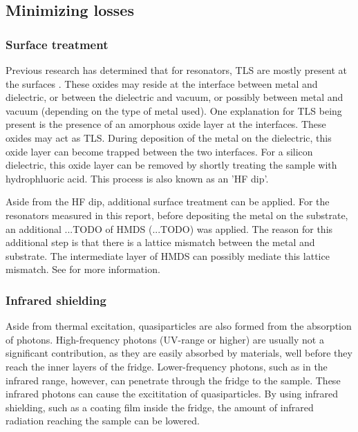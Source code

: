 \documentclass[12pt]{report}
\begin{document}
\subsection{Minimizing losses}

\subsubsection{Surface treatment}

Previous research has determined that for resonators, TLS are mostly present at the surfaces \cite{gao2008experimental}. These oxides may reside at the interface between metal and dielectric, or between the dielectric and vacuum, or possibly between metal and vacuum (depending on the type of metal used). One explanation for TLS being present is the presence of an amorphous oxide layer at the interfaces. These oxides may act as TLS. During deposition of the metal on the dielectric, this oxide layer can become trapped between the two interfaces. For a silicon dielectric, this oxide layer can be removed by shortly treating the sample with hydrophluoric acid. This process is also known as an 'HF dip'.

Aside from the HF dip, additional surface treatment can be applied. For the resonators measured in this report, before depositing the metal on the substrate, an additional ...TODO of HMDS (...TODO) was applied. The reason for this additional step is that there is a lattice mismatch between the metal and substrate. The intermediate layer of HMDS can possibly mediate this lattice mismatch. See \cite{DRIE} for more information.


\subsubsection{Infrared shielding}

Aside from thermal excitation, quasiparticles are also formed from the absorption of photons. High-frequency photons (UV-range or higher) are usually not a significant contribution, as they are easily absorbed by materials, well before they reach the inner layers of the fridge. Lower-frequency photons, such as in the infrared range, however, can penetrate through the fridge to the sample. These infrared photons can cause the excititation of quasiparticles. By using infrared shielding, such as a coating film inside the fridge, the amount of infrared radiation reaching the sample can be lowered.
\end{document}
